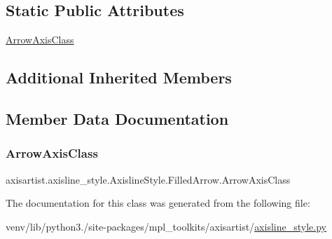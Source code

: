 \subsection*{Static Public Attributes}
\begin{DoxyCompactItemize}
\item 
\hyperlink{classaxisartist_1_1axisline__style_1_1AxislineStyle_1_1FilledArrow_adebab68a658c096007e4ce9eb7c76bfa}{Arrow\+Axis\+Class}
\end{DoxyCompactItemize}
\subsection*{Additional Inherited Members}


\subsection{Member Data Documentation}
\mbox{\label{classaxisartist_1_1axisline__style_1_1AxislineStyle_1_1FilledArrow_adebab68a658c096007e4ce9eb7c76bfa}} 
\subsubsection{\texorpdfstring{Arrow\+Axis\+Class}{ArrowAxisClass}}
{\footnotesize\ttfamily axisartist.\+axisline\+\_\+style.\+Axisline\+Style.\+Filled\+Arrow.\+Arrow\+Axis\+Class\hspace{0.3cm}{\ttfamily [static]}}



The documentation for this class was generated from the following file\+:\begin{DoxyCompactItemize}
\item 
venv/lib/python3./site-\/packages/mpl\+\_\+toolkits/axisartist/\hyperlink{axisartist_2axisline__style_8py}{axisline\+\_\+style.\+py}\end{DoxyCompactItemize}
